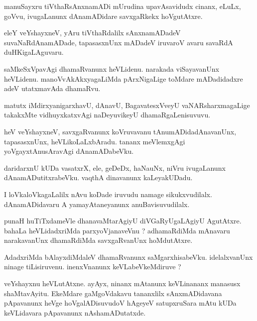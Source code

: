 \documentclass{article}
\begin{document}
\begin{mn}
manuSayxru tiVthaRsAnxnamADi mUrudina upavAsavidudx cinanx, eLuLx, goVvu, ivugaLanunx 
dAnamADidare savxgaRkekx hoVgutAtxre.
\end{mn}

\begin{mn}
eleY veYshayxneV, yAru tiVthaRdalilx sAnxnamADadeV suvaNaRdAnamADade, tapasasxnUnx mADadeV 
iruvaroV avaru savaRdA duHKigaLAguvaru.
\end{mn}

\begin{mn}
saMkeSxVpavAgi dhamaRvanunx heVLidenu. narakada viSayavanUnx heVLidenu. manoVvAkAkxyagaLiMda 
pArxNigaLige toMdare mADadidadxre adeV utatxmavAda dhamaRvu.
\end{mn}

\begin{mn}
matutx iMdirxyanigarxhavU, dAnavU, BagavatesxVveyU  vaNARsharxmagaLige takakxMte vidhuyxkatxvAgi 
naDeyuvikeyU dhamaRgaLenisuvuvu.
\end{mn}

\begin{mn}
heV veYshayxneV, savxgaRvanunx koVruvavanu tAnumADidadAnavanUnx, tapasasxnUnx, heVLikoLaLxbAradu. 
tananx meVlemxgAgi yoVgayxtAnusAravAgi dAnamADabeVku.
\end{mn}

\begin{mn}
daridarxnU kUDa vasatxrX, ele, geDeDx, haNauNx, niVru ivugaLanunx dAnamADutitxrabeVku. vaqthA 
dinavanunx kaLeyakUDadu.
\end{mn}

\begin{mn}
I loVkaloVkagaLalilx nAvu koDade iruvudu  namage sikukxvudilalx. dAnamADidavaru A yamayAtaneyanunx 
anuBavisuvudilalx.
\end{mn}


\begin{mn}
punaH huTiTxdameVle dhanavaMtarAgiyU diVGaRyUgaLAgiyU AgutAtxre. bahaLa heVLidadxriMda 
parxyoVjanaveVnu ? adhamaRdiMda mAnavaru narakavanUnx dhamaRdiMda savxgaRvanUnx hoMdutAtxre.
\end{mn}

\begin{mn}
AdadxriMda bAlayxdiMdaleV dhamaRvanunx saMgarxhisabeVku. idelalxvanUnx ninage tiLisiruvenu. 
inenxVnanunx keVLabeVkeMdiruve ?
\end{mn}

\begin{mn}
veYshayxnu heVLutAtxne. ayAyx, ninanx mAtanunx keVLinananx manasusx shaMtavAyitu. EkeMdare 
gaMgoVdakavu tananxlilx sAnxmADidavana pApavanunx heVge hoVgalADisuvudoV hAgeyeV satupxruSara 
mAtu kUDa keVLidavara pApavanunx  nAshamADutatxde.
\end{mn}
\end{document}

